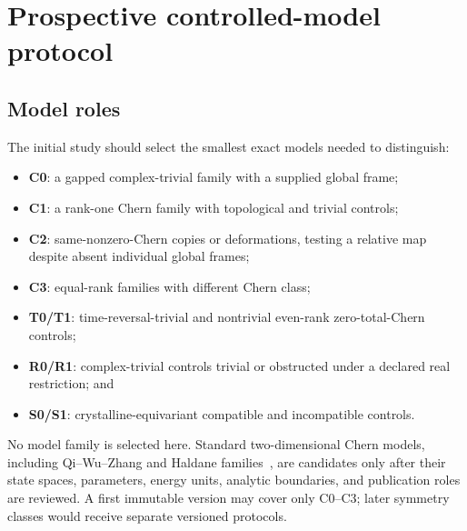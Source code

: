 \documentclass[11pt]{article}
\newenvironment{prospective}{\color{prospectivered}}{}
\begin{document}
\begin{prospective}
\section{Prospective controlled-model protocol}

\subsection{Model roles}
The initial study should select the smallest exact models needed to distinguish:
\begin{itemize}
 \item \textbf{C0}: a gapped complex-trivial family with a supplied global frame;
 \item \textbf{C1}: a rank-one Chern family with topological and trivial controls;
 \item \textbf{C2}: same-nonzero-Chern copies or deformations, testing a relative map
 despite absent individual global frames;
 \item \textbf{C3}: equal-rank families with different Chern class;
 \item \textbf{T0/T1}: time-reversal-trivial and nontrivial even-rank zero-total-Chern controls;
 \item \textbf{R0/R1}: complex-trivial controls trivial or obstructed under a declared real restriction; and
 \item \textbf{S0/S1}: crystalline-equivariant compatible and incompatible controls.
\end{itemize}
No model family is selected here. Standard two-dimensional Chern models, including
Qi--Wu--Zhang and Haldane families~\cite{qi2006,haldane1988}, are candidates only after
their state spaces, parameters, energy units, analytic boundaries, and publication roles
are reviewed. A first immutable version may cover only C0--C3; later symmetry classes
would receive separate versioned protocols.


\end{prospective}
\end{document}
